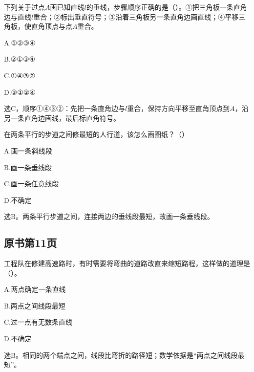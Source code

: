 下列关于过点\(A\)画已知直线\(l\)的垂线，步骤顺序正确的是（\hspace{1.8em}）。①把三角板一条直角边与直线\(l\)重合；②标出垂直符号；③沿着三角板另一条直角边画直线；④平移三角板，使直角顶点与点\(A\)重合。\par
\noindent A.①②③④\par
\noindent B.②①③④\par
\noindent C.①④③②\par
\noindent D.③①②④\par
\begin{BookAnswer}
选\(\mathrm C\)，顺序①④③②：先把一条直角边与\(l\)重合，保持方向平移至直角顶点到\(A\)，沿另一条直角边画线，最后标直角符号。
\end{BookAnswer}

在两条平行的步道之间修最短的人行道，该怎么画图纸？（\hspace{1.8em}）\par
\noindent A.画一条斜线段\par
\noindent B.画一条垂线段\par
\noindent C.画一条任意线段\par
\noindent D.不确定\par
\begin{BookAnswer}
选\(\mathrm B\)。两条平行步道之间，连接两边的垂线段最短，故画一条垂线段。
\end{BookAnswer}



\subsection*{原书第11页}

工程队在修建高速路时，有时需要将弯曲的道路改直来缩短路程，这样做的道理是（\hspace{1.8em}）。\par
\noindent A.两点确定一条直线\par
\noindent B.两点之间线段最短\par
\noindent C.过一点有无数条直线\par
\noindent D.不确定\par
\begin{BookAnswer}
选\(\mathrm B\)。相同的两个端点之间，线段比弯折的路径短；数学依据是“两点之间线段最短”。
\end{BookAnswer}

